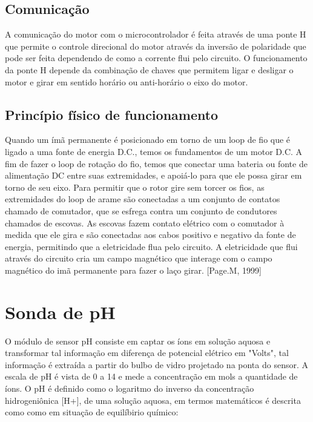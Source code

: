 \subsection{Comunicação}

A comunicação do motor com o microcontrolador é feita através de uma ponte H que permite o controle direcional do motor através da inversão de polaridade que pode ser feita dependendo de como a corrente flui pelo circuito. O funcionamento da ponte H depende da combinação de chaves que permitem ligar e desligar o motor e girar em sentido horário ou anti-horário o eixo do motor.

\subsection{Princípio físico de funcionamento}

Quando um ímã permanente é posicionado em torno de um loop de fio que é ligado a uma fonte de energia D.C., temos os fundamentos de um motor D.C. A fim de fazer o loop de rotação do fio, temos que conectar uma bateria ou fonte de alimentação DC entre suas extremidades, e apoiá-lo para que ele possa girar em torno de seu eixo. Para permitir que o rotor gire sem torcer os fios, as extremidades do loop de arame são conectadas a um conjunto de contatos chamado de comutador, que se esfrega contra um conjunto de condutores chamados de escovas. As escovas fazem contato elétrico com o comutador à medida que ele gira e são conectadas aos cabos positivo e negativo da fonte de energia, permitindo que a eletricidade flua pelo circuito. A eletricidade que flui através do circuito cria um campo magnético que interage com o campo magnético do imã permanente para fazer o laço girar\cite{page1999}. [Page.M, 1999]

\section{Sonda de pH}

O módulo de sensor pH consiste em captar os íons em solução aquosa e transformar tal informação
em diferença de potencial elétrico em "Volts", tal informação é extraída a partir do bulbo de vidro
projetado na ponta do sensor. A escala de pH é vista de 0 a 14 e mede a concentração em mols a
quantidade de íons. O pH é definido como o logaritmo do inverso da concentração hidrogeniônica
[H+], de uma solução aquosa, em termos matemáticos é descrita como como em situação de
equilíbirio químico\cite{atkins2011}:

